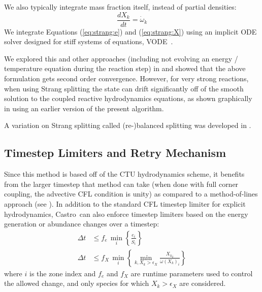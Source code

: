 \documentclass[times,modern]{aastex63}
\newcommand{\castro}{{\sf Castro}}
\newcommand{\omegadot}{\dot{\omega}}
\newcommand{\odt}[1]{{\frac{{d#1}}{dt}}}
\newcommand{\MarginPar}[1]{\marginpar{\vskip-\baselineskip\raggedright\tiny\sffamily\hrule\smallskip{\color{red}#1}\par\smallskip\hrule}}
\begin{document}
We also typically integrate mass fraction itself, instead of partial
densities:
\begin{equation}
\label{eq:strang:X}
\odt{X_k} = \omegadot_k
\end{equation}
We integrate Equations (\ref{eq:strang:e}) and (\ref{eq:strang:X}) using
an implicit ODE solver designed for stiff systems of
equations, VODE~\citep{vode}.

We explored this and other approaches (including not evolving an
energy / temperature equation during the reaction step) in
\citet{strang_rnaas} and showed that the above formulation gets second
order convergence.  However, for very strong reactions, when using
Strang splitting the state can drift significantly off of the smooth
solution to the coupled reactive hydrodynamics equations, as shown
graphically in \cite{astronum:2018} using an earlier version of the
present algorithm.

A variation on Strang splitting called (re-)balanced splitting was
developed in \citet{speth:2013}.


\subsection{Timestep Limiters and Retry Mechanism}

Since this method is based off of the CTU hydrodynamics scheme, it
benefits from the larger timestep that method can take (when done with
full corner coupling, the advective CFL condition is unity)
as compared to a method-of-lines approach (see
\citealt{ppmunsplit}).  In addition to the standard CFL timestep
limiter for explicit hydrodynamics, \castro\ can also enforce
timestep limiters based on the energy generation or abundance changes
over a timestep: \MarginPar{do we enforce this in the NSE region?}
\begin{align}
\label{eq:dt:nuce}
\Delta t &\le f_e\, \min_{i} \left\{\frac{e_{i}}{\dot{S}_{i}}\right\} \\
%
\label{eq:dt:nucX}
\Delta t &\le f_X\, \min_{i} \left\{\min_{k,X_k > \epsilon_X}\frac{{X_k}_{i}}{{\omegadot(X_k)_i}}\right\}
\end{align}
where $i$ is the zone index and $f_e$ and $f_X$ are runtime parameters
used to control the allowed change, and only species for which $X_k > \epsilon_X$ are considered.
\end{document}
